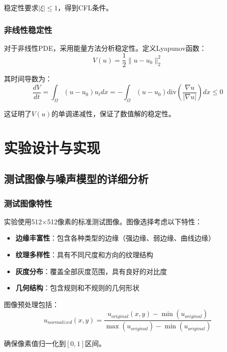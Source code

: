 \documentclass[a4paper,12pt]{ctexart}
\begin{document}
稳定性要求$|\xi| \leq 1$，得到CFL条件。

\subsubsection{非线性稳定性}

对于非线性PDE，采用能量方法分析稳定性。定义Lyapunov函数：
\begin{equation}
V(u) = \frac{1}{2}\|u - u_0\|_2^2
\end{equation}

其时间导数为：
\begin{equation}
\frac{dV}{dt} = \int_\Omega (u - u_0) u_t dx = -\int_\Omega (u - u_0) \text{div}\left(\frac{\nabla u}{|\nabla u|}\right) dx \leq 0
\end{equation}

这证明了$V(u)$的单调递减性，保证了数值解的稳定性。

\section{实验设计与实现}

\subsection{测试图像与噪声模型的详细分析}

\subsubsection{测试图像特性}

实验使用512×512像素的标准测试图像。图像选择考虑以下特性：

\begin{itemize}
    \item \textbf{边缘丰富性}：包含各种类型的边缘（强边缘、弱边缘、曲线边缘）
    \item \textbf{纹理多样性}：具有不同尺度和方向的纹理结构
    \item \textbf{灰度分布}：覆盖全部灰度范围，具有良好的对比度
    \item \textbf{几何结构}：包含规则和不规则的几何形状
\end{itemize}

图像预处理包括：
\begin{equation}
u_{normalized}(x,y) = \frac{u_{original}(x,y) - \min(u_{original})}{\max(u_{original}) - \min(u_{original})}
\end{equation}

确保像素值归一化到$[0,1]$区间。
\end{document}
